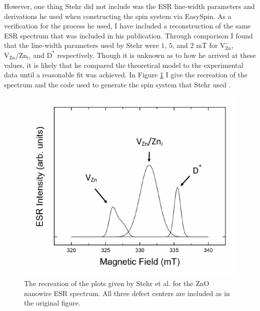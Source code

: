 \documentclass[oneside, astronomy, noacknowlegments]{BYUPhys}
\begin{document}
However, one thing Stehr did not include was the ESR line-width parameters and derivations he used when constructing the spin system via EasySpin. As a verification for the process he used, I have included a reconstruction of the same ESR spectrum that was included in his publication. Through comparison I found that the line-width parameters used by Stehr were $1$, $5$, and $2$ mT for 
$\text{V}_{\text{Zn}}^{-}$, $\text{V}_{\text{Zn}}/\text{Zn}_{\text{i}}$, and $\text{D}^{*}$ respectively. Though it is unknown as to how he arrived at these values, it is likely that he compared the theoretical model to the experimental data until a reasonable fit was achieved. In Figure \ref{fig:StehrRec} I give the recreation of the spectrum and the code used to generate the spin system that Stehr used \cite{RefWorks:doc:58929128e4b0228a292928a7}.


\begin{figure}
    \centerline{\includegraphics{stehr_rec_fig}}
    \caption[Recreation of ZnO Nanowire ESR]{\label{fig:StehrRec}
     The recreation of the plots given by Stehr et al. for the ZnO nanowire ESR spectrum. All three defect centers are included as in the original figure. }
 \end{figure}
\end{document}
